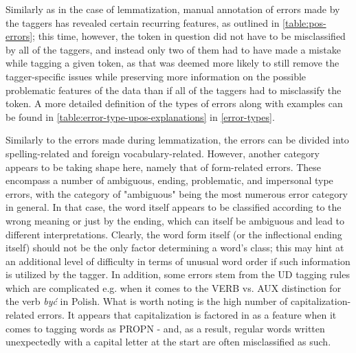 Similarly as in the case of lemmatization, manual annotation of errors made by the taggers has revealed certain recurring features, as outlined in \autoref{table:pos-errors}; this time, however, the token in question did not have to be misclassified by all of the taggers, and instead only two of them had to have made a mistake while tagging a given token, as that was deemed more likely to still remove the tagger-specific issues while preserving more information on the possible problematic features of the data than if all of the taggers had to misclassify the token. A more detailed definition of the types of errors along with examples can be found in \autoref{table:error-type-upos-explanations} in \autoref{error-types}.

Similarly to the errors made during lemmatization, the errors can be divided into spelling-related and foreign vocabulary-related. However, another category appears to be taking shape here, namely that of form-related errors. These encompass a number of ambiguous, ending, problematic, and impersonal type errors, with the category of "ambiguous" being the most numerous error category in general. In that case, the word itself appears to be classified according to the wrong meaning or just by the ending, which can itself be ambiguous and lead to different interpretations. Clearly, the word form itself (or the inflectional ending itself) should not be the only factor determining a word's class; this may hint at an additional level of difficulty in terms of unusual word order if such information is utilized by the tagger. In addition, some errors stem from the UD tagging rules which are complicated e.g. when it comes to the VERB vs. AUX distinction for the verb \textit{być} in Polish. What is worth noting is the high number of capitalization-related errors. It appears that capitalization is factored in as a feature when it comes to tagging words as PROPN - and, as a result, regular words written unexpectedly with a capital letter at the start are often misclassified as such. 

